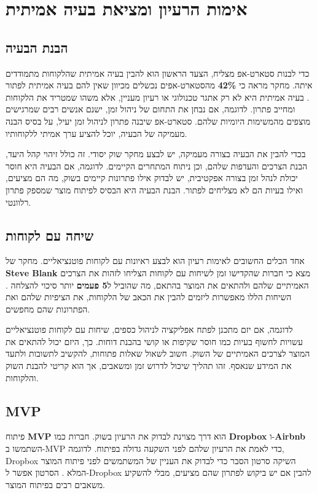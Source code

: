 \chapter{אימות הרעיון ומציאת בעיה אמיתית}

\section{הבנת הבעיה}
כדי לבנות סטארט-אפ מצליח, הצעד הראשון הוא להבין בעיה אמיתית שהלקוחות מתמודדים איתה. מחקר מראה כי \textbf{42\%} מהסטארט-אפים נכשלים מכיוון שאין להם בעיה אמיתית לפתור \cite{CBInsights2020failure}. בעיה אמיתית היא לא רק אתגר טכנולוגי או רעיון מעניין, אלא משהו שמטריד את הלקוחות ומחייב פתרון. לדוגמה, אם נבחן את התחום של ניהול זמן, ישנם אנשים רבים שמרגישים מוצפים מהמשימות היומיות שלהם. סטארט-אפ שיבנה פתרון לניהול זמן יעיל, על בסיס הבנה מעמיקה של הבעיה, יוכל להציע ערך אמיתי ללקוחותיו.

בכדי להבין את הבעיה בצורה מעמיקה, יש לבצע מחקר שוק יסודי. זה כולל זיהוי קהל היעד, הבנת הצרכים והעדפות שלהם, וכן ניתוח המתחרים הקיימים. לדוגמה, אם הבעיה היא חוסר יכולת לנהל זמן בצורה אפקטיבית, יש לבדוק אילו פתרונות קיימים בשוק, מה הם מציעים, ואילו בעיות הם לא מצליחים לפתור. הבנת הבעיה היא הבסיס לפיתוח מוצר שמספק פתרון רלוונטי.

\section{שיחה עם לקוחות}
אחד הכלים החשובים לאימות רעיון הוא לבצע ראיונות עם לקוחות פוטנציאליים. מחקר של \textbf{Steve Blank} מצא כי חברות שהקדישו זמן לשיחות עם לקוחות הצליחו לזהות את הצרכים האמיתיים שלהם ולהתאים את המוצר בהתאם, מה שהוביל ל\textbf{5 פעמים} יותר סיכוי להצלחה \cite{blank2013startup}. השיחות הללו מאפשרות ליזמים להבין את הכאב של הלקוחות, את הציפיות שלהם ואת הפתרונות שהם מחפשים.

לדוגמה, אם יזם מתכנן לפתח אפליקציה לניהול כספים, שיחות עם לקוחות פוטנציאליים עשויות לחשוף בעיות כמו חוסר שקיפות או קושי בהבנת דוחות. כך, היזם יכול להתאים את המוצר לצרכים האמיתיים של השוק. חשוב לשאול שאלות פתוחות, להקשיב לתשובות ולתעד את המידע שנאסף. זהו תהליך שיכול לדרוש זמן ומשאבים, אך הוא קריטי להבנת השוק והלקוחות.

\section{MVP \texorpdfstring{}{(Minimum Viable Product)}}
פיתוח \textbf{MVP} הוא דרך מצוינת לבדוק את הרעיון בשוק. חברות כמו \textbf{Dropbox} ו-\textbf{Airbnb} השתמשו ב-MVP כדי לאמת את הרעיון שלהם לפני השקעה גדולה בפיתוח. לדוגמה, Dropbox השיקה סרטון הסבר כדי לבדוק את העניין של המשתמשים לפני פיתוח המוצר המלא \cite{ries2011lean}. הסרטון אפשר ל-Dropbox להבין אם יש ביקוש לפתרון שהם מציעים, מבלי להשקיע משאבים רבים בפיתוח המוצר.

